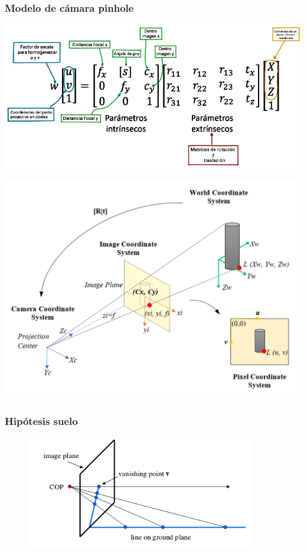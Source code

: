 \documentclass{beamer}
\begin{document}
\begin{frame}
	\frametitle{Modelo de cámara pinhole}
	
	\centering
	\begin{minipage}{0.5\textwidth}
		\centering
		\includegraphics[width=\textwidth]{figs/esquema_pinhole_matrices.jpg}
	\end{minipage}
	
	
	\begin{minipage}{0.5\textwidth}
		\centering
		\includegraphics[width=\textwidth]{figs/pinholecoordinates.png}
	\end{minipage}
	
\end{frame}


\begin{frame}
	\frametitle{Hipótesis suelo}
	\begin{figure}
		\centering
		\includegraphics[width=10cm]{figs/hipotesissuelo.png}
	\end{figure}
\end{frame}
\end{document}
